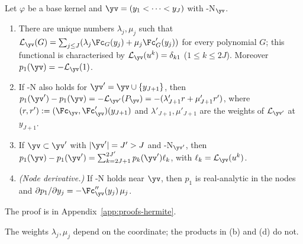 \begin{lemma}\label{lem:dualrule}
Let $\varphi$ be a base kernel and $\yv=(y_1<\dots<y_J)$ with \hyp{N}$_{\yv}$.
\begin{enumerate}[label=(\alph*),leftmargin=2em]
\item There are unique numbers $\lambda_j,\mu_j$ such that
$\mathcal L_{\yv}(G)=\sum_{j\le J}(\lambda_j\Fc_G(y_j)+\mu_j\Fc_G'(y_j))$ for every polynomial $G$; this
functional is characterised by $\mathcal L_{\yv}(u^k)=\delta_{k1}$ ($1\le k\le2J$). Moreover
$p_1(\yv)=-\mathcal L_{\yv}(1)$.
\item If \hyp{N} also holds for $\yv'=\yv\cup\{y_{J+1}\}$, then
$p_1(\yv')-p_1(\yv)=-\mathcal L_{\yv'}(P_{\yv})=-(\lambda'_{J+1}r+\mu'_{J+1}r')$, where
$(r,r'):=(\Fc_{\yv},\Fc_{\yv}')(y_{J+1})$ and $\lambda'_{J+1},\mu'_{J+1}$ are the weights of $\mathcal L_{\yv'}$ at
$y_{J+1}$.
\item If $\yv\subset\yv'$ with $\lvert\yv'\rvert=J'>J$ and \hyp{N}$_{\yv'}$, then
$p_1(\yv)-p_1(\yv')=\sum_{k=2J+1}^{2J'}p_k(\yv')\ell_k$, with $\ell_k=\mathcal L_{\yv}(u^k)$.
\item \emph{(Node derivative.)} If \hyp{N} holds near $\yv$, then $p_1$ is real-analytic in the nodes and
$\partial p_1/\partial y_j=-\Fc_{\yv}''(y_j)\,\mu_j$.
\end{enumerate}
\end{lemma}

The proof is in Appendix~\ref{app:proofs-hermite}.

The weights $\lambda_j,\mu_j$ depend on the coordinate; the products in (b) and (d) do not.

